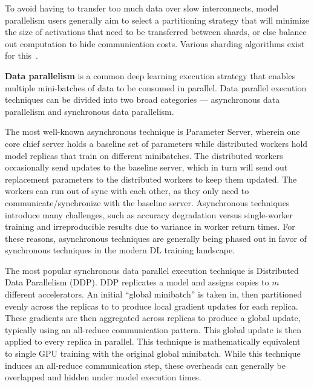 To avoid having to transfer too much data over slow interconnects, model parallelism users generally aim to select a partitioning strategy that will minimize the size of activations that need to be transferred between shards, or else balance out computation to hide communication costs. Various sharding algorithms exist for this~\cite{flexflow2018,gpipe2019,lamp2020,mpanalysis2019,hydra2021,zero2019}.

\textbf{Data parallelism} is a common deep learning execution strategy that enables multiple mini-batches of data to be consumed in parallel. Data parallel execution techniques can be divided into two broad categories --- asynchronous data parallelism and synchronous data parallelism. 

The most well-known asynchronous technique is Parameter Server, wherein one core chief server holds a baseline set of parameters while distributed workers hold model replicas that train on different minibatches. The distributed workers occasionally send updates to the baseline server, which in turn will send out replacement parameters to the distributed workers to keep them updated. The workers can run out of sync with each other, as they only need to communicate/synchronize with the baseline server. Asynchronous techniques introduce many challenges, such as accuracy degradation versus single-worker training and irreproducible results due to variance in worker return times. For these reasons, asynchronous techniques are generally being phased out in favor of synchronous techniques in the modern DL training landscape. 

The most popular synchronous data parallel execution technique is Distributed Data Parallelism (DDP). DDP replicates a model and assigns copies to $m$ different accelerators. An initial ``global minibatch'' is taken in, then partitioned evenly across the replicas to to produce local gradient updates for each replica. These gradients are then aggregated across replicas to produce a global update, typically using an all-reduce communication pattern. This global update is then applied to every replica in parallel. This technique is mathematically equivalent to single GPU training with the original global minibatch. While this technique induces an all-reduce communication step, these overheads can generally be overlapped and hidden under model execution times.

